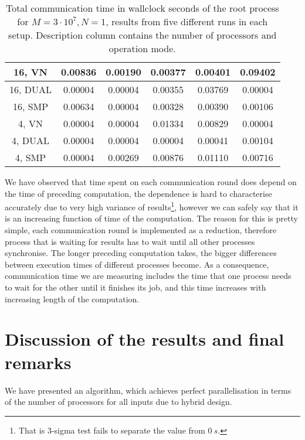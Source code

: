 \begin{table}
\centering
\begin{tabular}{c|c|c|c|c|c}
16, VN   & 0.00836 & 0.00190 & 0.00377 & 0.00401 & 0.09402 \\
\hline
16, DUAL & 0.00004 & 0.00004 & 0.00355 & 0.03769 & 0.00004 \\
\hline
16, SMP  & 0.00634 & 0.00004 & 0.00328 & 0.00390 & 0.00106 \\
\hline
4,  VN   & 0.00004 & 0.00004 & 0.01334 & 0.00829 & 0.00004 \\
\hline
4,  DUAL & 0.00004 & 0.00004 & 0.00004 & 0.00041 & 0.00104 \\
\hline
4,  SMP  & 0.00004 & 0.00269 & 0.00876 & 0.01110 & 0.00716 \\
\hline
\end{tabular}
\caption{Total communication time in wallclock seconds of the root process for $M = 3 \cdot 10^{7}, N = 1$, results from five different runs in each setup. Description column contains the number of processors and operation mode.}
\end{table}

We have observed that time spent on each communication round does depend on the time of preceding computation, the dependence is hard to characterise accurately due to very high variance of results\footnote{That is $3$-sigma test fails to separate the value from $\SI{0}{s}$.}, however we can safely say that it is an increasing function of time of the computation.
The reason for this is pretty simple, each communication round is implemented as a reduction, therefore process that is waiting for results has to wait until all other processes synchronise.
The longer preceding computation takes, the bigger differences between execution times of different processes become.
As a consequence, communication time we are measuring includes the time that one process needs to wait for the other until it finishes its job, and this time increases with increasing length of the computation.

\section*{Discussion of the results and final remarks}

We have presented an algorithm, which achieves perfect parallelisation in terms of the number of processors for all inputs due to hybrid design.


